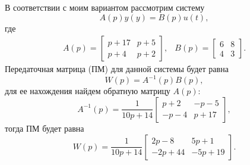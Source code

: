 В соответствии с моим вариантом рассмотрим систему
\begin{equation*}
    A(p)y(y)=B(p)u(t),
\end{equation*}
где
\begin{equation*}
    \begin{array}{cc}
        A(p)=\begin{bmatrix}
            p+17&p+5\\
            p+4&p+2
        \end{bmatrix}, &
        B(p)=\begin{bmatrix}
            6&8\\4&3
        \end{bmatrix}.        
    \end{array}
\end{equation*}
Передаточная матрица (ПМ) для данной системы будет равна
\begin{equation*}
    W(p)=A^{-1}(p)B(p),
\end{equation*}
для ее нахождения найдем обратную матрицу $A(p)$:
\begin{equation*}
    A^{-1}(p)=\frac{1}{10p+14}\begin{bmatrix}
        p+2&-p-5\\-p-4&p+17
    \end{bmatrix},
\end{equation*}
тогда ПМ будет равна
\begin{equation*}
    W(p)=\frac{1}{10p+14}\begin{bmatrix}
        2p-8&5p+1\\-2p+44&-5p+19
    \end{bmatrix}.
\end{equation*}


